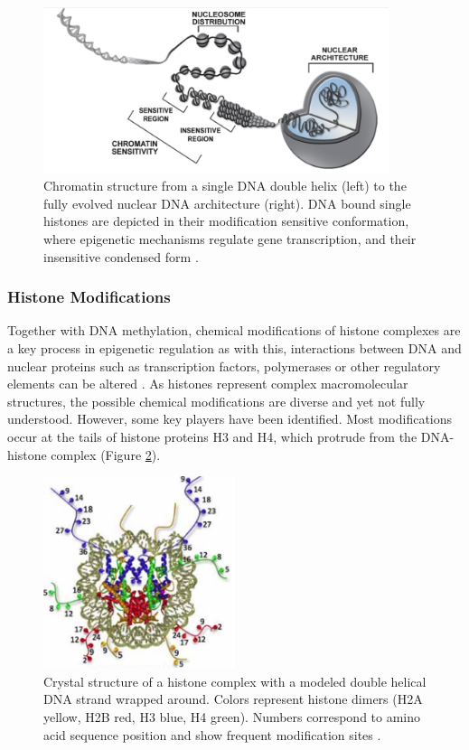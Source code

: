 \documentclass{article}
\begin{document}
\begin{figure}[htb]
\centering
\includegraphics[width = 0.9\textwidth]{Figure4}
\caption{Chromatin structure from a single DNA double helix (left) to the fully evolved nuclear DNA architecture (right). DNA bound single histones are depicted in their modification sensitive conformation, where epigenetic mechanisms regulate gene transcription, and their insensitive condensed form \cite{image3}. }\label{fig: chromatin structure}
\end{figure}

\subsubsection{Histone Modifications}\label{sec: Histone Modifications}
Together with DNA methylation, chemical modifications of histone complexes are a key process in epigenetic regulation as with this, interactions between DNA and nuclear proteins such as transcription factors, polymerases or other regulatory elements can be altered \cite{mersfelder2006tale}. As histones represent complex macromolecular structures, the possible chemical modifications are diverse and yet not fully understood. However, some key players have been identified. Most modifications occur at the tails of histone proteins H3 and H4, which protrude from the DNA-histone complex \cite{lorch1987nucleosomes} (Figure \ref{fig: crystal structure}). 

\begin{figure}[htb]
\centering
\includegraphics[width = 0.5\textwidth]{Figure5}
\caption{Crystal structure of a histone complex with a modeled double helical DNA strand wrapped around. Colors represent histone dimers (H2A yellow, H2B red, H3 blue, H4 green). Numbers correspond to amino acid sequence position and show frequent modification sites \cite{hansen2010histone}. }\label{fig: crystal structure}
\end{figure}
\end{document}
